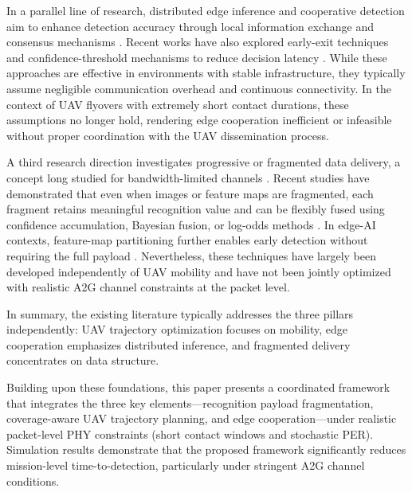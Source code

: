 \documentclass[conference]{IEEEtran}
\begin{document}
In a parallel line of research, distributed edge inference and cooperative detection aim to enhance detection accuracy through local information exchange and consensus mechanisms \cite{blum2002distributed,ren2023survey}. Recent works have also explored early-exit techniques and confidence-threshold mechanisms to reduce decision latency \cite{teerapittayanon2016branchynet}. While these approaches are effective in environments with stable infrastructure, they typically assume negligible communication overhead and continuous connectivity. In the context of UAV flyovers with extremely short contact durations, these assumptions no longer hold, rendering edge cooperation inefficient or infeasible without proper coordination with the UAV dissemination process.

A third research direction investigates progressive or fragmented data delivery, a concept long studied for bandwidth-limited channels \cite{tzou1987progressive,chee1999survey}. Recent studies have demonstrated that even when images or feature maps are fragmented, each fragment retains meaningful recognition value and can be flexibly fused using confidence accumulation, Bayesian fusion, or log-odds methods \cite{feng2019hierarchical,chen2020progressive}. In edge-AI contexts, feature-map partitioning further enables early detection without requiring the full payload \cite{mitzenmacher2004digital,zhao2018deepthings,zeng2020coedge}. Nevertheless, these techniques have largely been developed independently of UAV mobility and have not been jointly optimized with realistic A2G channel constraints at the packet level.

In summary, the existing literature typically addresses the three pillars independently: UAV trajectory optimization focuses on mobility, edge cooperation emphasizes distributed inference, and fragmented delivery concentrates on data structure. 

Building upon these foundations, this paper presents a coordinated framework that integrates the three key elements---recognition payload fragmentation, coverage-aware UAV trajectory planning, and edge cooperation---under realistic packet-level PHY constraints (short contact windows and stochastic PER). Simulation results demonstrate that the proposed framework significantly reduces mission-level time-to-detection, particularly under stringent A2G channel conditions.
\end{document}
